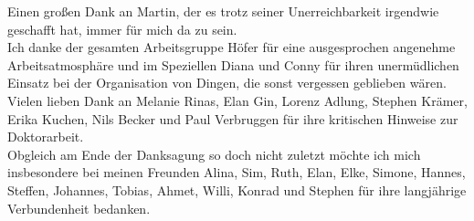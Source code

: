 Einen gro\ss{}en Dank an Martin, der es trotz seiner Unerreichbarkeit irgendwie geschafft hat, immer f\"{u}r mich da zu sein.\\

Ich danke der gesamten Arbeitsgruppe H\"{o}fer f\"{u}r eine ausgesprochen angenehme Arbeitsatmosph\"{a}re und im Speziellen Diana und Conny f\"ur ihren unerm\"{u}dlichen Einsatz bei der Organisation von Dingen, die sonst vergessen geblieben w\"{a}ren.\\

Vielen lieben Dank an Melanie Rinas, Elan Gin, Lorenz Adlung, Stephen Kr\"{a}mer, Erika Kuchen, Nils Becker und Paul Verbruggen f\"{u}r ihre kritischen Hinweise zur Doktorarbeit.  \\

\newpage
\thispagestyle{plain6}
Obgleich am Ende der Danksagung so doch nicht zuletzt m\"{o}chte ich mich insbesondere bei meinen Freunden Alina, Sim, Ruth, Elan, Elke, Simone, Hannes, Steffen, Johannes, Tobias, Ahmet, Willi, Konrad und Stephen f\"{u}r ihre langj\"{a}hrige Verbundenheit bedanken.  

  